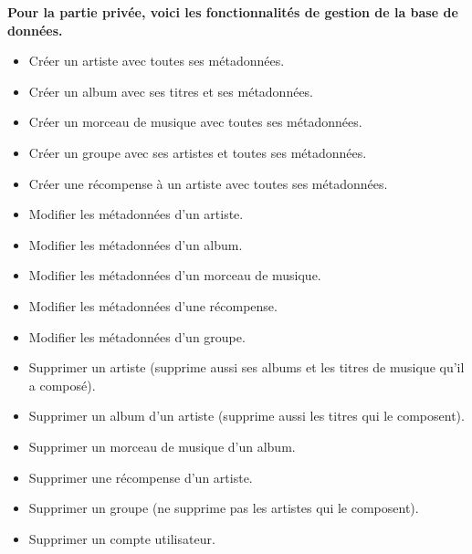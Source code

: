         \begin{paragraphe}
            \textbf{Pour la partie privée, voici les fonctionnalités de gestion de la base de
            données.}
            \vspace{1em}
            \begin{itemize}
                \item Créer un artiste avec toutes ses métadonnées.
                \item Créer un album avec ses titres et ses métadonnées.
                \item Créer un morceau de musique avec toutes ses métadonnées.
                \item Créer un groupe avec ses artistes et toutes ses métadonnées.
                \item Créer une récompense à un artiste avec toutes ses métadonnées.
            \end{itemize}
            \vspace{1em}
            \begin{itemize}
                \item Modifier les métadonnées d'un artiste.
                \item Modifier les métadonnées d'un album.
                \item Modifier les métadonnées d'un morceau de musique.
                \item Modifier les métadonnées d'une récompense.
                \item Modifier les métadonnées d'un groupe.
            \end{itemize}
            \vspace{1em}
            \begin{itemize}
                \item Supprimer un artiste (supprime aussi ses albums et les titres de
                musique qu'il a composé).
                \item Supprimer un album d'un artiste (supprime aussi les titres qui le composent).
                \item Supprimer un morceau de musique d'un album.
                \item Supprimer une récompense d'un artiste.
                \item Supprimer un groupe (ne supprime pas les artistes qui le composent).
                \item Supprimer un compte utilisateur.
            \end{itemize}

\end{paragraphe}
